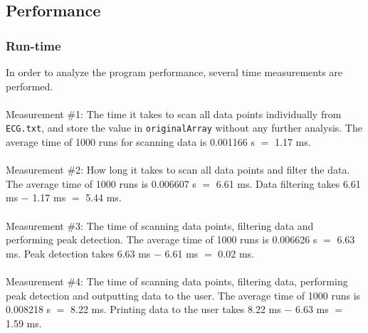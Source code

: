 \subsection{Performance}
\subsubsection{Run-time}
In order to analyze the program performance, several time measurements are performed. \\
\\
Measurement \#1: The time it takes to scan all data points individually from \texttt{ECG.txt}, and store the value in \texttt{originalArray} without any further analysis. The average time of 1000 runs for scanning data is 0.001166 s $=$ 1.17 ms. \\
\\
Measurement \#2: How long it takes to scan all data points and filter the data. The average time of 1000 runs is 0.006607 s $=$ 6.61 ms. Data filtering takes 6.61 ms $-$ 1.17 ms $=$ 5.44 ms. \\
\\
Measurement \#3: The time of scanning data points, filtering data and performing peak detection. The average time of 1000 runs is 0.006626 s $=$ 6.63 ms. Peak detection takes 6.63 ms $-$ 6.61 ms $=$ 0.02 ms.\\
\\
Measurement \#4: The time of scanning data points, filtering data, performing peak detection and outputting data to the user. The average time of 1000 runs is 0.008218 s $=$ 8.22 ms. Printing data to the user takes 8.22 ms $-$ 6.63 ms $=$ 1.59 ms.\\
\\

